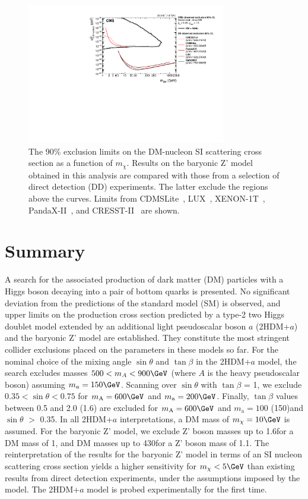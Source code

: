 \begin{figure}
  \centering
  \includegraphics[width=0.775\textwidth]{figures/limits/SpinIndepend_XsecDM_MonoHbb_bb_obs_Summary.pdf}
  \caption{The 90\% \CL exclusion limits on the DM-nucleon SI scattering cross section as a function of $m_{\chi}$. 
Results on the baryonic Z' model obtained in this analysis are compared with those from a selection of direct detection (DD) experiments. 
The latter exclude the regions above the curves. 
Limits from CDMSLite~\cite{CDMSLite}, LUX~\cite{LUX}, XENON-1T~\cite{XENON1T}, PandaX-II~\cite{PandaxII}, and CRESST-II~\cite{CresstII} are shown.}
  \label{fig:limitsdd}
\end{figure}


\section{Summary}

A search for the associated production of dark matter (DM) particles with a Higgs
boson decaying into a pair of bottom quarks is presented. No significant
deviation from the predictions of the standard model (SM) is observed, and upper limits on
the production cross section predicted by a type-2 two Higgs doublet model
extended by an additional light pseudoscalar boson $a$ (2HDM+$a$) and the
baryonic Z' model are established. They constitute the most stringent collider exclusions placed on the parameters in these
models so far. For the nominal choice of the mixing angle $\sin\theta$
and $\tan\beta$ in the 2HDM+$a$ model, the search excludes masses
$500<m_A<900\GeV$ (where $A$ is the heavy pseudoscalar boson) assuming $m_a=150\GeV$. Scanning over
$\sin\theta$ with $\tan\beta$ = 1, we exclude
$0.35<\sin\theta<0.75$ for $m_\text{A}=600\GeV$ and
$m_\text{a}=200\GeV$.  Finally, $\tan\beta$ values between 0.5 and 2.0
(1.6) are excluded for $m_\text{A}=600\GeV$ and $m_\text{a}=100$
(150)\GeV and $\sin\theta$ $>$ 0.35. In all 2HDM+$a$ interpretations, a DM mass of $m_\chi=10\GeV$ is assumed. For the baryonic Z' model, we exclude Z' boson masses up to 1.6\TeV for a DM mass of 1\GeV, and DM masses up to 430\GeV for a Z' boson mass of 1.1\TeV. The reinterpretation of the results for the baryonic Z' model in terms of an SI nucleon scattering cross section yields a higher sensitivity for $m_\chi<5\GeV$ than existing results from direct detection experiments, under the assumptions imposed by the model. The 2HDM+$a$ model is probed experimentally for the first time.

 
